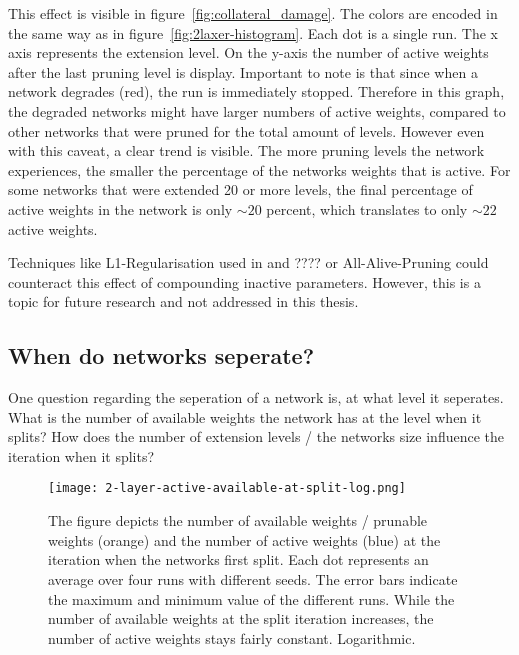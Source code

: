 This effect is visible in figure~\ref{fig:collateral_damage}.
The colors are encoded in the same way as in figure~\ref{fig:2laxer-histogram}.
Each dot is a single run. 
The x axis represents the extension level.
On the y-axis the number of active weights after the last pruning level is display.
Important to note is that since when a network degrades (red), the run is immediately stopped.
Therefore in this graph, the degraded networks might have larger numbers of active weights, compared to other networks that were pruned for the total amount of levels.
However even with this caveat, a clear trend is visible.
The more pruning levels the network experiences, the smaller the percentage of the networks weights that is active.
For some networks that were extended 20 or more levels, the final percentage of active weights in the network is only $\sim20$ percent, which translates to only $\sim22$ active weights.

Techniques like L1-Regularisation used in \autocite{HanEtAl15} and ??\autocite{DBLP:conf/iclr/FrankleC19}?? or All-Alive-Pruning \autocite{AllAlivePruning} could counteract this effect of compounding inactive parameters.
However, this is a topic for future research and not addressed in this thesis. 

\subsection{When do networks seperate?}
One question regarding the seperation of a network is, at what level it seperates.
What is the number of available weights the network has at the level when it splits?
How does the number of extension levels / the networks size influence the iteration when it splits?

\begin{figure}[ht]
    \centering
    \texttt{[image: 2-layer-active-available-at-split-log.png]}
    \caption{
        The figure depicts the number of available weights / prunable weights (orange) and the number of active weights (blue) at the iteration when the networks first split.
        Each dot represents an average over four runs with different seeds.
        The error bars indicate the maximum and minimum value of the different runs.
        While the number of available weights at the split iteration increases, the number of active weights stays fairly constant.
        Logarithmic.
    }\label{fig:2l-active-split}
\end{figure}

